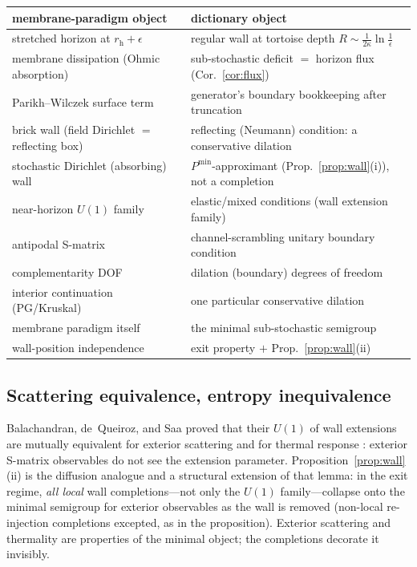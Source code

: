 \documentclass[11pt]{article}
\theoremstyle{definition}
\theoremstyle{remark}
\newcommand{\rh}{r_{\mathrm{h}}}
\begin{document}
\begin{center}
\small
\begin{tabular}{@{}ll@{}}
\toprule
membrane-paradigm object & dictionary object \\
\midrule
stretched horizon at $\rh+\epsilon$ & regular wall at tortoise depth
$R\sim\frac{1}{2\kappa}\ln\frac{1}{\epsilon}$ \\
membrane dissipation (Ohmic absorption) & sub-stochastic deficit
$=$ horizon flux (Cor.~\ref{cor:flux}) \\
Parikh--Wilczek surface term & generator's boundary bookkeeping after
truncation \\
brick wall (field Dirichlet $=$ reflecting box)
\cite{tHooftBrickWall1985} & reflecting (Neumann) condition: a
conservative dilation \\
stochastic Dirichlet (absorbing) wall & $P^{\min}$-approximant
(Prop.~\ref{prop:wall}(i)), not a completion \\
near-horizon $U(1)$ family \cite{Balachandran2018,GuptaSen2002} &
elastic/mixed conditions (wall extension family) \\
antipodal S-matrix \cite{tHooftAntipodal2016} & channel-scrambling
unitary boundary condition \\
complementarity DOF \cite{STU1993} & dilation (boundary) degrees of
freedom \\
interior continuation (PG/Kruskal) & one particular conservative
dilation \\
membrane paradigm itself & the minimal sub-stochastic semigroup \\
wall-position independence & exit property $+$
Prop.~\ref{prop:wall}(ii) \\
\bottomrule
\end{tabular}
\end{center}

\subsection{Scattering equivalence, entropy inequivalence}
\label{subsec:entropy}

Balachandran, de~Queiroz, and Saa proved that their $U(1)$ of wall
extensions are mutually equivalent for exterior scattering and for
thermal response \cite{Balachandran2018}: exterior S-matrix
observables do not see the extension parameter.
Proposition~\ref{prop:wall}(ii) is the diffusion analogue and a
structural extension of that lemma: in the exit regime, \emph{all
local} wall completions---not only the $U(1)$ family---collapse onto the
minimal semigroup for exterior observables as the wall is removed
(non-local re-injection completions excepted, as in the proposition).
Exterior scattering and thermality are properties of the minimal
object; the completions decorate it invisibly.
\end{document}
